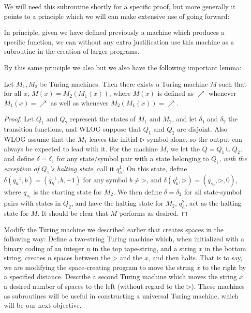 We will need this subroutine shortly for a specific proof, but more generally it points to a principle which we will can make extensive use of going forward:
\begin{center}
	In principle, given we have defined previously a machine which produces a specific function, we can without any extra justification use this machine as a subroutine in the creation of larger programs. 
\end{center}
	By this same principle we also but we also have the following important lemma:
\begin{lemma}
    Let $M_1,M_2$ be Turing machines. Then there exists a Turing machine $M$ such that for all $x$, $M(x) = M_2(M_1(x))$, where $M(x)$ is defined as $\nearrow$ whenever $M_1(x) = \nearrow$ as well as whenever $M_2(M_1(x)) = \nearrow$. 
\end{lemma}
\begin{proof}
    Let $Q_1$ and $Q_2$ represent the states of $M_1$ and $M_2$, and let $\delta_1$ and $\delta_2$ the transition functions, and WLOG suppose that $Q_1$ and $Q_2$ are disjoint. 
    Also WLOG assume that the $M_1$ leaves the initial $\triangleright$ symbol alone, so the output can always be expected to lead with it. For the machine $M$, we let the $Q=Q_1 \cup Q_2$, and define $\delta = \delta_1$ for any state/symbol pair with a state belonging to $Q_1$, \textit{with the exception of $Q_1$'s halting state}, call it $q_h^1$. 
    On this state, define $\delta({q_h}^1,b) = ({q_h}^1,b,-1)$ for any symbol $b \neq \triangleright$, and $\delta(q_h^1,\triangleright)=(q_{s_2},\triangleright,0)$, where $q_{s_2}$ is the starting state for $M_2$. We then define $\delta = \delta_2$ for all state-symbol pairs with states in $Q_2$, and have the halting state for $M_2$, $q_h^2$, act as the halting state for $M$. It should be clear that $M$ performs as desired. 
\end{proof}
\begin{exercise}
	Modify the Turing machine we described earlier that creates spaces in the following way: Define a two-string Turing machine which, when initialized with a binary coding of an integer $n$ in the top tape-string, and a string $x$ in the bottom string, creates $n$ spaces between the $\triangleright$ and the $x$, and then halts. That is to say, we are modifying the space-creating program to move the string $x$ to the right by a specified distance. Describe a second Turing machine which moves the string $x$ a desired number of spaces to the left (without regard to the $\triangleright$). These machines as subroutines will be useful in constructing a universal Turing machine, which will be our next objective. 
\end{exercise}
